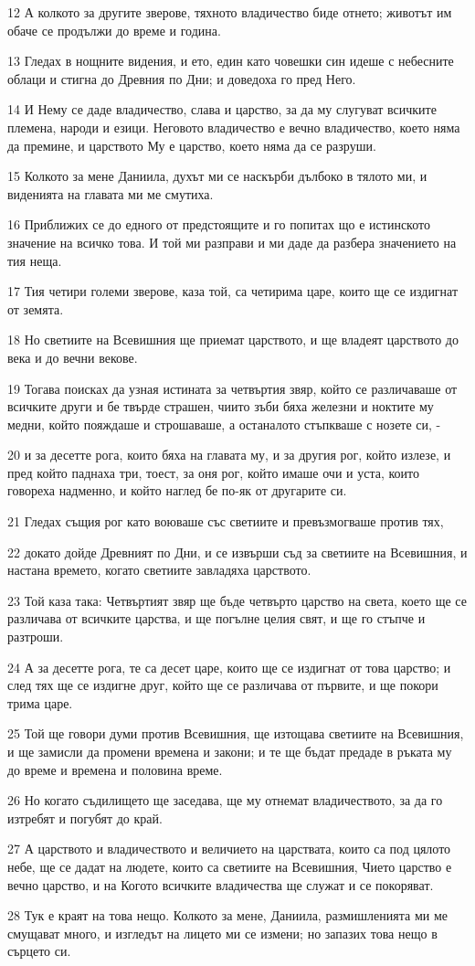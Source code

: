 \par 12 А колкото за другите зверове, тяхното владичество биде отнето; животът им обаче се продължи до време и година.
\par 13 Гледах в нощните видения, и ето, един като човешки син идеше с небесните облаци и стигна до Древния по Дни; и доведоха го пред Него.
\par 14 И Нему се даде владичество, слава и царство, за да му слугуват всичките племена, народи и езици. Неговото владичество е вечно владичество, което няма да премине, и царството Му е царство, което няма да се разруши.
\par 15 Колкото за мене Даниила, духът ми се наскърби дълбоко в тялото ми, и виденията на главата ми ме смутиха.
\par 16 Приближих се до едного от предстоящите и го попитах що е истинското значение на всичко това. И той ми разправи и ми даде да разбера значението на тия неща.
\par 17 Тия четири големи зверове, каза той, са четирима царе, които ще се издигнат от земята.
\par 18 Но светиите на Всевишния ще приемат царството, и ще владеят царството до века и до вечни векове.
\par 19 Тогава поисках да узная истината за четвъртия звяр, който се различаваше от всичките други и бе твърде страшен, чиито зъби бяха железни и ноктите му медни, който пояждаше и строшаваше, а останалото стъпкваше с нозете си, -
\par 20 и за десетте рога, които бяха на главата му, и за другия рог, който излезе, и пред който паднаха три, тоест, за оня рог, който имаше очи и уста, които говореха надменно, и който наглед бе по-як от другарите си.
\par 21 Гледах същия рог като воюваше със светиите и превъзмогваше против тях,
\par 22 докато дойде Древният по Дни, и се извърши съд за светиите на Всевишния, и настана времето, когато светиите завладяха царството.
\par 23 Той каза така: Четвъртият звяр ще бъде четвърто царство на света, което ще се различава от всичките царства, и ще погълне целия свят, и ще го стъпче и разтроши.
\par 24 А за десетте рога, те са десет царе, които ще се издигнат от това царство; и след тях ще се издигне друг, който ще се различава от първите, и ще покори трима царе.
\par 25 Той ще говори думи против Всевишния, ще изтощава светиите на Всевишния, и ще замисли да промени времена и закони; и те ще бъдат предаде в ръката му до време и времена и половина време.
\par 26 Но когато съдилището ще заседава, ще му отнемат владичеството, за да го изтребят и погубят до край.
\par 27 А царството и владичеството и величието на царствата, които са под цялото небе, ще се дадат на людете, които са светиите на Всевишния, Чието царство е вечно царство, и на Когото всичките владичества ще служат и се покоряват.
\par 28 Тук е краят на това нещо. Колкото за мене, Даниила, размишленията ми ме смущават много, и изгледът на лицето ми се измени; но запазих това нещо в сърцето си.

